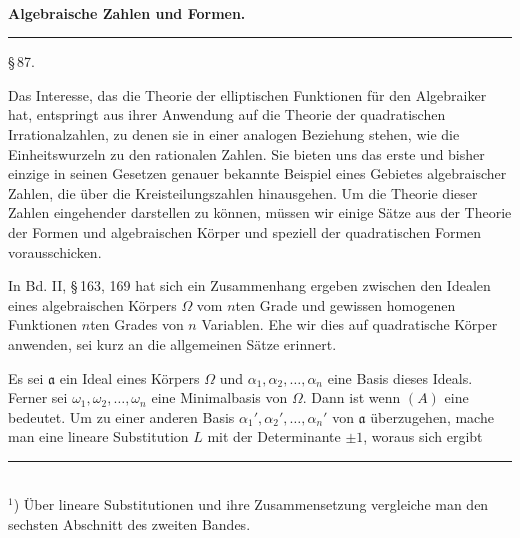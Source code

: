 
\begin{center}
\\[4pt]
\textbf{Algebraische Zahlen und Formen.}
\end{center}

\begin{center}
\rule{0.25\textwidth}{0.4pt}
\end{center}

\begin{center}
\S\,87. 
\end{center}

Das Interesse, das die Theorie der elliptischen Funktionen für den Algebraiker hat, entspringt aus ihrer Anwendung auf die Theorie der quadratischen Irrationalzahlen, zu denen sie in einer analogen Beziehung stehen, wie die Einheitswurzeln zu den rationalen Zahlen. Sie bieten uns das erste und bisher einzige in seinen Gesetzen genauer bekannte Beispiel eines Gebietes algebraischer Zahlen, die über die Kreisteilungszahlen hinausgehen. Um die Theorie dieser Zahlen eingehender darstellen zu können, müssen wir einige Sätze aus der Theorie der Formen und algebraischen Körper und speziell der quadratischen Formen vorausschicken.

In Bd. II, \S\,163, 169 hat sich ein Zusammenhang ergeben zwischen den Idealen eines algebraischen Körpers $\Omega$ vom $n$ten Grade und gewissen homogenen Funktionen $n$ten Grades von $n$ Variablen. Ehe wir dies auf quadratische Körper anwenden, sei kurz an die allgemeinen Sätze erinnert.

Es sei $\mathfrak{a}$ ein Ideal eines Körpers $\Omega$ und $\alpha_1, \alpha_2, \ldots, \alpha_n$ eine Basis dieses Ideals. Ferner sei $\omega_1, \omega_2, \ldots, \omega_n$ eine Minimalbasis von $\Omega$. Dann ist
wenn $(A)$ eine  bedeutet. Um zu einer anderen Basis $\alpha_1', \alpha_2', \ldots, \alpha_n'$ von $\mathfrak{a}$ überzugehen, mache man eine lineare Substitution $L$ mit der Determinante $\pm 1$,
woraus sich ergibt

\medskip
\noindent\rule{0.3\textwidth}{0.4pt}\\
$^{1}$) Über lineare Substitutionen und ihre Zusammensetzung vergleiche man den sechsten Abschnitt des zweiten Bandes.
